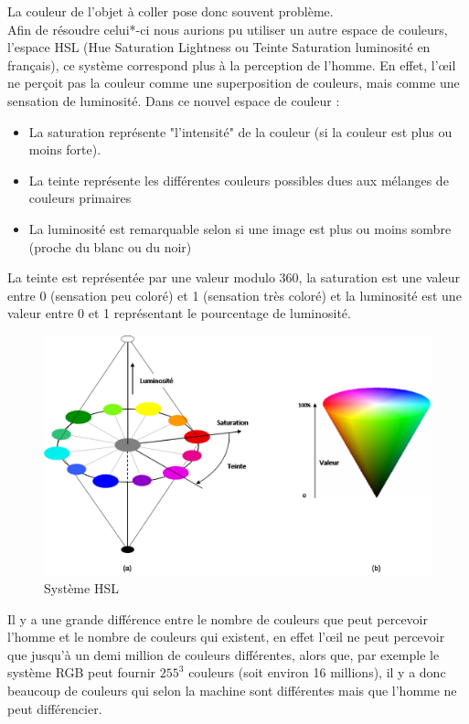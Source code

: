 La couleur de l'objet à coller pose donc souvent problème.\\
Afin de résoudre celui*-ci nous aurions pu utiliser un autre espace de couleurs, l'espace HSL (Hue Saturation Lightness ou Teinte Saturation luminosité en français), ce système correspond plus à la perception de l'homme. En effet, l'œil ne perçoit pas la couleur comme une superposition de couleurs, mais comme une sensation de luminosité. Dans ce nouvel espace de couleur : 
\begin{itemize}
\item La saturation représente "l'intensité" de la couleur (si la couleur est plus ou moins forte).
\item  La teinte représente les différentes couleurs possibles dues aux mélanges de couleurs primaires
\item La luminosité est remarquable selon si une image est plus ou moins sombre (proche du blanc ou du noir)
\end{itemize} 
La teinte est représentée par une valeur modulo 360, la saturation est une valeur entre 0 (sensation peu coloré) et 1 (sensation très coloré) et la luminosité est une valeur entre 0 et 1 représentant le pourcentage de luminosité.
\begin{figure}
\centering
 \includegraphics[scale=0.5]{Images/TSL.png}
 \caption{Système HSL}
\end{figure}
 
 Il y a une grande différence entre le nombre de couleurs que peut percevoir l'homme et le nombre de couleurs qui existent, en effet l'œil ne peut percevoir que jusqu'à un demi million de couleurs différentes, alors que, par exemple le système RGB peut fournir $255^3$ couleurs (soit environ 16 millions), il y a donc beaucoup de couleurs qui selon la machine sont différentes mais que l'homme ne peut différencier.
